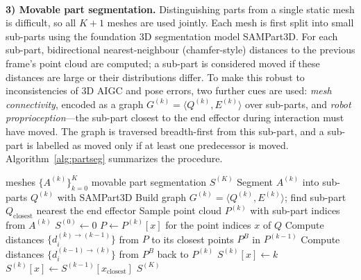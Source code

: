 \documentclass[12pt,a4paper,final]{extreport}
\begin{document}
\paragraph{} \textbf{3) Movable part segmentation.} Distinguishing parts from a single static mesh is difficult, so all $K+1$ meshes are used jointly. Each mesh is first split into small sub-parts using the foundation 3D segmentation model SAMPart3D. For each sub-part, bidirectional nearest-neighbour (chamfer-style) distances to the previous frame's point cloud are computed; a sub-part is considered moved if these distances are large or their distributions differ. To make this robust to inconsistencies of 3D AIGC and pose errors, two further cues are used: \emph{mesh connectivity}, encoded as a graph $G^{(k)}=\langle Q^{(k)},E^{(k)}\rangle$ over sub-parts, and \emph{robot proprioception}---the sub-part closest to the end effector during interaction must have moved. The graph is traversed breadth-first from this sub-part, and a sub-part is labelled as moved only if at least one predecessor is moved. Algorithm~\ref{alg:partseg} summarizes the procedure.

\begin{algorithm}[htbp]
\caption{Movable part segmentation in DexSim2Real$^2$ (adapted from \cite{p1})}\label{alg:partseg}
\begin{algorithmic}[1]
\Require meshes $\{A^{(k)}\}_{k=0}^{K}$
\Ensure movable part segmentation $S^{(K)}$
  \State Segment $A^{(k)}$ into sub-parts $Q^{(k)}$ with SAMPart3D
  \State Build graph $G^{(k)}=\langle Q^{(k)},E^{(k)}\rangle$; find sub-part $Q_{\mathrm{closest}}$ nearest the end effector
  \State Sample point cloud $P^{(k)}$ with sub-part indices from $A^{(k)}$
\EndFor
\State $S^{(0)}\gets 0$
    \State $P\gets P^{(k)}[x]$ for the point indices $x$ of $Q$
    \State Compute distances $\{d_i^{(k)\to(k-1)}\}$ from $P$ to its closest points $P^B$ in $P^{(k-1)}$
    \State Compute distances $\{d_i^{(k-1)\to(k)}\}$ from $P^B$ back to $P^{(k)}$
      \State $S^{(k)}[x]\gets k$
    \Else
      \State $S^{(k)}[x]\gets S^{(k-1)}[x_{\mathrm{closest}}]$
    \EndIf
  \EndFor
\EndFor
\State \Return $S^{(K)}$
\end{algorithmic}
\end{algorithm}
\end{document}
